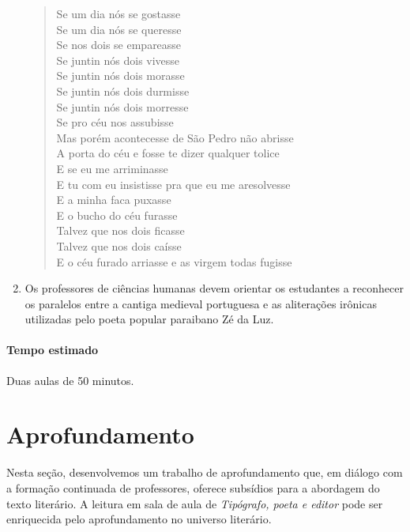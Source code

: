 \documentclass[12pt]{extarticle}
\begin{document}
\begin{enumerate}
\begin{verse} 
Se um dia nós se gostasse\\ 
Se um dia nós se queresse\\ 
Se nos dois se empareasse\\ 
Se juntin nós dois vivesse\\ 
Se juntin nós dois morasse\\ 
Se juntin nós dois durmisse\\ 
Se juntin nós dois morresse\\ 
Se pro céu nos assubisse\\
\medskip
Mas porém acontecesse de São Pedro não abrisse\\ 
A porta do céu e fosse te dizer qualquer tolice\\ 
E se eu me arriminasse\\ 
E tu com eu insistisse pra que eu me aresolvesse\\ 
E a minha faca puxasse\\ 
E o bucho do céu furasse\\
Talvez que nos dois ficasse\\ 
Talvez que nos dois caísse\\ 
E o céu furado arriasse e as virgem todas fugisse\\ 
\end{verse}

\item Os professores de ciências humanas devem orientar os estudantes
  a reconhecer os paralelos entre a cantiga medieval portuguesa e as
  aliterações irônicas utilizadas pelo poeta popular paraibano Zé da Luz.

\end{enumerate}

\paragraph{Tempo estimado} Duas aulas de 50 minutos.



\section{Aprofundamento}


Nesta seção, desenvolvemos um trabalho de aprofundamento que, em diálogo com
a formação continuada de professores, oferece subsídios para a abordagem do
texto literário. A leitura em sala de aula de \emph{Tipógrafo, poeta e editor}
pode ser enriquecida pelo aprofundamento no universo literário.
\end{document}
